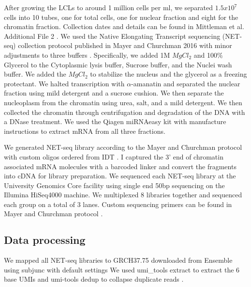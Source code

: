After growing the LCLs to around 1 million cells per ml, we separated $1.5x10^{7}$ cells into 10 tubes, one for total cells, one for nuclear fraction and eight for the chromatin fraction. Collection dates and details can be found in Mittleman et al. Additional File 2 \cite{mittleman_alternative_2020}. We used the Native Elongating Transcript sequencing (NET-seq) collection protocol published in Mayer and Churchman 2016 with minor adjustments to three buffers \citep{mayr_evolution_2016}. Specifically, we added 1M $MgCl_{2}$ and 100\% Glycerol to the Cytoplasmic lysis buffer, Sucrose buffer, and the Nuclei wash buffer. We added the $MgCl_{2}$ to stabilize the nucleus and the glycerol as a freezing protectant. We halted transcription with $\alpha$-amanatin and separated the nuclear fraction using mild detergent and a sucrose cushion. We then separate the nucleoplasm from the chromatin using urea, salt, and a mild detergent. We then collected the chromatin through centrifugation and degradation of the DNA with a DNase treatment. We used the Qiagen miRNAeasy kit with manufacture instructions to extract mRNA from all three fractions.


We generated NET-seq library according to the Mayer and Churchman protocol with custom oligos ordered from IDT \citep{mayr_evolution_2016}. I captured the 3' end of chromatin associated mRNA molecules with a barcoded linker and convert the fragments into cDNA for library preparation. We sequenced each NET-seq library at the University Genomics Core facility using single end 50bp sequencing on the Illumina HiSeq4000 machine. We multiplexed 8 libraries together and sequenced each group on a total of 3 lanes. Custom sequencing primers can be found in Mayer and Churchman protocol \citep{mayr_evolution_2016}. 


\subsection{Data processing}\label{Data-processing}



We mapped all NET-seq libraries to GRCH37.75 downloaded from Ensemble using subjunc with default settings \citep{international_human_genome_sequencing_consortium_initial_2001, Liao2013} We used umi\_tools extract to extract the 6 base UMIs and umi-tools dedup to collapse duplicate reads \citep{smith_umi-tools_2017}. 
 
